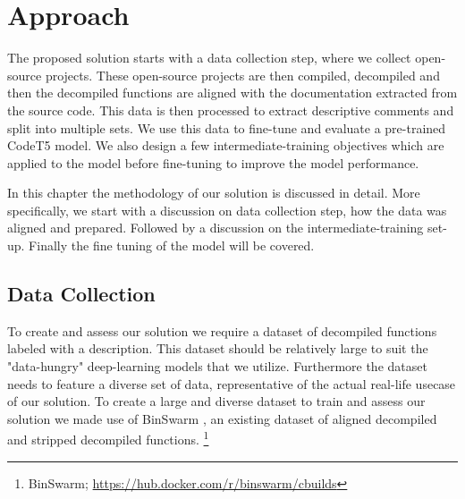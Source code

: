 \chapter{Approach}
\label{methodology}

The proposed solution starts with a data collection step, where we collect open-source projects. These open-source projects are then compiled, decompiled and then the decompiled functions are aligned with the documentation extracted from the source code. This data is then processed to extract descriptive comments and split into multiple sets. We use this data to fine-tune and evaluate a pre-trained CodeT5 model. We also design a few intermediate-training objectives which are applied to the model before fine-tuning to improve the model performance. 

In this chapter the methodology of our solution is discussed in detail. More specifically, we start with a discussion on data collection step, how the data was aligned and prepared. Followed by a discussion on the intermediate-training set-up. Finally the fine tuning of the model will be covered.

\section{Data Collection}
To create and assess our solution we require a dataset of decompiled functions labeled with a description. This dataset should be relatively large to suit the "data-hungry" deep-learning models that we utilize. Furthermore the dataset needs to feature a diverse set of data, representative of the actual real-life usecase of our solution. 
To create a large and diverse dataset to train and assess our solution we made use of BinSwarm \cite{InlinedFunc}, an existing dataset of aligned decompiled and stripped decompiled functions. \footnote{BinSwarm; \url{https://hub.docker.com/r/binswarm/cbuilds}}

